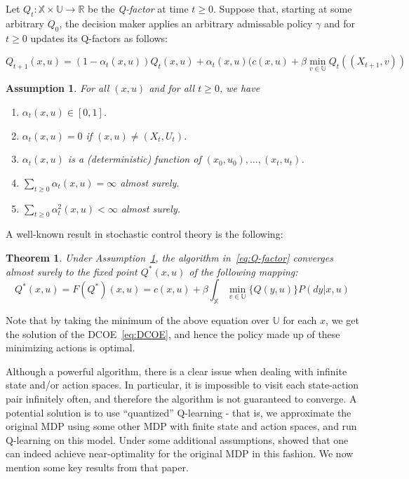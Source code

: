 \documentclass{article}
\newtheorem{theorem}{Theorem}[section]
\newtheorem{assumption}{Assumption}[section]
\begin{document}
Let \(Q_t : \mathbb{X} \times \mathbb{U} \to \mathbb{R} \) be the \emph{Q-factor} at time \(t\ge0\). Suppose that, starting at some arbitrary \(Q_0\), the decision maker applies an arbitrary admissable policy \(\gamma\) and for \(t\ge0\) updates its Q-factors as follows:

\begin{equation}
    Q_{t+1}(x,u) = (1- \alpha_t(x,u))Q_t(x,u) + \alpha_t(x,u)(c(x,u)+\beta \; \underset{v\in\mathbb{U}}{\text{min}} \; Q_t((X_{t+1},v))\label{eq:Q-factor}
\end{equation}

\begin{assumption}\label{assumption:alpha}
    For all \((x,u)\) and for all \(t\ge0\), we have
    \begin{enumerate}
        \item \(\alpha_t(x,u) \in [0,1]\).
        \item \(\alpha_t(x,u) = 0 \) if \((x,u) \neq (X_t,U_t)\).
        \item \(\alpha_t(x,u) \) is a (deterministic) function of \((x_0,u_0),\ldots,(x_t,u_t)\).
        \item \(\sum_{t\ge0}\alpha_t(x,u) = \infty\) almost surely.
        \item \(\sum_{t\ge0}\alpha_t^2(x,u) < \infty\) almost surely.
    \end{enumerate}
\end{assumption}

A well-known result in stochastic control theory is the following:
\begin{theorem}
    Under Assumption~\ref{assumption:alpha}, the algorithm in~\eqref{eq:Q-factor} converges almost surely to the fixed point \(Q^*(x,u)\) of the following mapping:
    \[Q^*(x,u) = F(Q^*)(x,u) = c(x,u) + \beta\int_\mathbb{X}\min_{v\in\mathbb{U}}\bigl\{Q(y,u)\bigl\}P(dy | x,u)\]
\end{theorem}

Note that by taking the minimum of the above equation over \(\mathbb{U}\) for each \(x\), we get the solution of the DCOE~\eqref{eq:DCOE}, and hence the policy made up of these minimizing actions is optimal.

Although a powerful algorithm, there is a clear issue when dealing with infinite state and/or action spaces. In particular, it is impossible to visit each state-action pair infinitely often, and therefore the algorithm is not guaranteed to converge. A potential solution is to use ``quantized'' Q-learning - that is, we approximate the original MDP using some other MDP with finite state and action spaces, and run Q-learning on this model. Under some additional assumptions, \cite{Kara} showed that one can indeed achieve near-optimality for the original MDP in this fashion. We now mention some key results from that paper.
\end{document}
